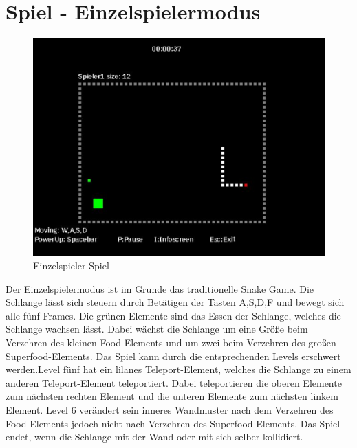 \section{Spiel - Einzelspielermodus}
\label{Spiel_-_Einzelspielermodus}
%
\begin{figure}[h]
 \centering
 \includegraphics[scale=0.5]{bilder/Einzelspielermodus}
 \caption{Einzelspieler Spiel}
 \label{fig:einzelspielermodus}
\end{figure}
	Der Einzelspielermodus ist im Grunde das traditionelle Snake Game. Die Schlange lässt sich steuern durch Betätigen der Tasten A,S,D,F und bewegt sich alle fünf Frames. Die grünen Elemente sind das Essen der Schlange, welches die Schlange wachsen lässt. Dabei wächst die Schlange um eine Größe beim Verzehren des kleinen Food-Elements und um zwei beim Verzehren des großen Superfood-Elements.
	Das Spiel kann durch die entsprechenden Levels erschwert werden.Level fünf hat ein lilanes Teleport-Element, welches die Schlange zu einem anderen Teleport-Element teleportiert. Dabei teleportieren die oberen Elemente zum nächsten rechten Element und die unteren Elemente zum nächsten linkem Element. Level 6 verändert sein inneres Wandmuster nach dem Verzehren des Food-Elements jedoch nicht nach Verzehren des Superfood-Elements. Das Spiel endet, wenn die Schlange mit der Wand oder mit sich selber kollidiert.   



